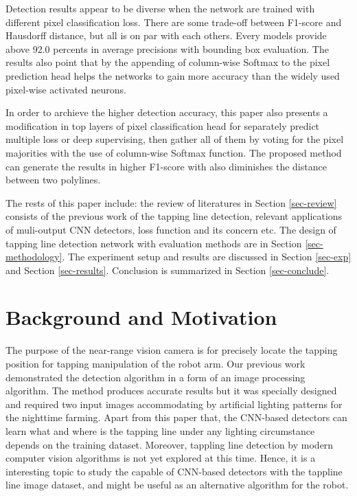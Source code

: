 \documentclass[default,pdflatex,iicol]{sn-jnl}%
\begin{document}
Detection results appear to be diverse when the network are trained with different pixel classification loss. There are some trade-off between F1-score and Hausdorff distance, but all is on par with each others. Every models provide above 92.0 percents in average precisions with bounding box evaluation. The results also point that by the appending of column-wise Softmax to the pixel prediction head helps the networks to gain more accuracy than the widely used pixel-wise activated neurons. 

In order to archieve the higher detection accuracy, this paper also presents a modification in top layers of pixel classification head for separately predict multiple loss or deep supervising, then gather all of them by voting for the pixel majorities with the use of column-wise Softmax function. The proposed method can generate the results in higher F1-score with also diminishes the distance between two polylines.

The rests of this paper include: the review of literatures in Section \ref{sec-review} \textemdash consists of the previous work of the tapping line detection, relevant applications of muli-output CNN detectors, loss function and its concern etc. The design of tapping line detection network with evaluation methods are in Section \ref{sec-methodology}. The experiment setup and results are discussed in Section \ref{sec-exp} and Section \ref{sec-results}. Conclusion is summarized in Section \ref{sec-conclude}.

\section{Background and Motivation}\label{sec-background}
The purpose of the near-range vision camera is for precisely locate the tapping position for tapping manipulation of the robot arm. Our previous work \cite{Wongtanawijit_2021} demonstrated the detection algorithm in a form of an image processing algorithm. The method produces accurate results but it was specially designed and required two input images accommodating by artificial lighting patterns for the nighttime farming. Apart from this paper that, the CNN-based detectors can learn what and where is the tapping line under any lighting circumstance depends on the training dataset. Moreover, tappling line detection by modern computer vision algorithms is not yet explored at this time. Hence, it is a interesting topic to study the capable of CNN-based detectors with the tappline line image dataset, and might be useful as an alternative algorithm for the robot.
\end{document}

